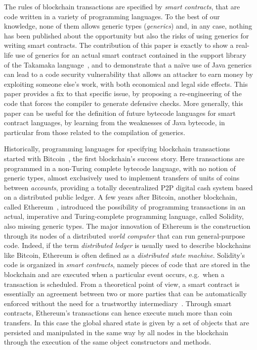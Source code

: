The rules of blockchain transactions are specified by \emph{smart contracts},
that are code written in a variety of programming languages. To the best of our knowledge, none of them allows generic types (\emph{generics})
and, in any case,
nothing has been published about the opportunity but also the risks of using generics for writing smart contracts.
The contribution of this paper is exactly to show a real-life
use of generics for an actual smart contract contained in the support
library of the Takamaka language~\cite{Spoto19,Spoto20},
and to demonstrate that a na\"{i}ve use
of Java generics can lead to a code security vulnerability that
allows an attacker to earn money by exploiting someone else's work, with both economical and legal side effects.
This paper provides a fix to that specific issue,
by proposing a re-engineering of the code that forces the compiler to generate defensive checks.
More generally, this paper can be useful for the definition of
future bytecode languages for smart contract languages, by
learning from the weaknesses of Java bytecode, in particular from those related to the
compilation of generics.

Historically, programming languages for specifying blockchain transactions started with
Bitcoin~\cite{Nakamoto08,book-mastering-bitcoin}, the first blockchain's success story. Here transactions are programmed in a non-Turing complete bytecode language, with no notion of generic types, almost exclusively used to implement transfers of units of coins between \emph{accounts}, providing a totally decentralized P2P digital cash system based on a distributed public ledger. 
%
A few years after Bitcoin, another blockchain, called Ethereum~\cite{Buterin13,AntonopoulosW18}, introduced the possibility of programming transactions in an actual, imperative and Turing-complete programming language, called Solidity, also missing generic types. The major innovation of Ethereum is the construction through its nodes of a distributed \emph{world computer} that can run general-purpose code. Indeed, if the term \emph{distributed ledger} is usually used to describe blockchains like Bitcoin, Ethereum is often defined as a \emph{distributed state machine}. Solidity's code is organized in \emph{smart contracts}, namely pieces of code that are stored in the blockchain and are executed when a particular event occurs, e.g.\ when a transaction is scheduled. From a theoretical point of view, a smart contract is essentially an agreement between two or more parties that can be automatically enforced without the need for a trustworthy intermediary~\cite{ebp}. Through smart contracts, Ethereum's transactions can hence execute much more than coin transfers. In this case the global shared state is given by a set of objects that are persisted and manipulated in the same way by all nodes in the blockchain through the execution of the same object constructors and methods.

